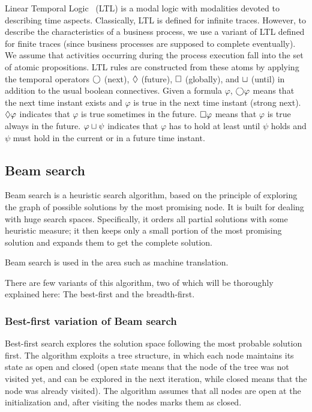 Linear Temporal Logic~\cite{Pnueli77} (LTL) is a modal logic with modalities devoted to describing time aspects. Classically, LTL is defined for infinite traces. However, to describe the characteristics of a business process, we use a variant of LTL defined for finite traces (since business processes are supposed to complete eventually).
%
We assume that activities occurring during the process execution fall into the set of atomic propositions. LTL rules are constructed from these atoms by applying the temporal operators $\bigcirc$ (next), $\lozenge$ (future), $\square$ (globally), and $\sqcup$ (until) in addition to the usual boolean connectives. Given a formula $\varphi$, $\bigcirc \varphi$ means that the next time instant exists and $\varphi$ is true in the next time instant (strong next). $\lozenge \varphi$ indicates that $\varphi$ is true sometimes in the future. $\square \varphi$ means that $\varphi$ is true always in the future. $\varphi \sqcup \psi$ indicates that $\varphi$ has to hold at least until $\psi$  holds and $\psi$ must hold in the current or in a future time instant.

\subsection{Beam search}

Beam search is a heuristic search algorithm, based on the principle of exploring the graph of possible solutions by the most promising node. It is built for dealing with huge search spaces. Specifically, it orders all partial solutions with some heuristic measure; it then keeps only a small portion of the most promising solution and expands them to get the complete solution.

Beam search is used in the area such as machine translation\cite{Koehn2007MOSEStranslationSystem}.


There are few variants of this algorithm, two of which will be thoroughly explained here: The best-first and the breadth-first. 

\subsubsection{Best-first variation of Beam search}

Best-first search explores the solution space following the most probable solution first. The algorithm exploits a tree structure, in which each node maintains its state as open and closed (open state means that the node of the tree was not visited yet, and can be explored in the next iteration, while closed means that the node was already visited). The algorithm assumes that all nodes are open at the initialization and, after visiting the nodes marks them as closed. 

